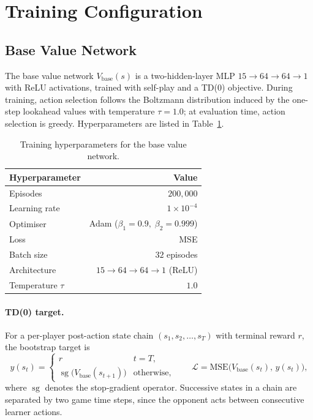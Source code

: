 \section{Training Configuration}
\label{app:hyper}

\subsection{Base Value Network}

The base value network $V_{\text{base}}(s)$ is a two-hidden-layer MLP
$15 \to 64 \to 64 \to 1$ with ReLU activations, trained with self-play
and a TD(0) objective. During training, action selection follows the
Boltzmann distribution induced by the one-step lookahead values with
temperature $\tau = 1.0$; at evaluation time, action selection is
greedy. Hyperparameters are listed in Table~\ref{tab:base-hyper}.

\begin{table}[h]
\centering
\caption{Training hyperparameters for the base value network.}
\label{tab:base-hyper}
\begin{tabular}{lr}
\toprule
\textbf{Hyperparameter} & \textbf{Value} \\
\midrule
Episodes              & $200{,}000$         \\
Learning rate         & $1\times 10^{-4}$   \\
Optimiser             & Adam ($\beta_1{=}0.9,\;\beta_2{=}0.999$) \\
Loss                  & MSE                 \\
Batch size            & $32$ episodes       \\
Architecture          & $15 \to 64 \to 64 \to 1$ (ReLU) \\
Temperature $\tau$    & $1.0$               \\
\bottomrule
\end{tabular}
\end{table}

\paragraph{TD(0) target.}
For a per-player post-action state chain $(s_1, s_2, \dots, s_T)$ with
terminal reward $r$, the bootstrap target is
\begin{equation*}
y(s_t) =
\begin{cases}
r & t = T, \\
\operatorname{sg}\!\bigl(V_{\text{base}}(s_{t+1})\bigr) & \text{otherwise},
\end{cases}
\qquad
\mathcal{L} = \mathrm{MSE}\!\bigl(V_{\text{base}}(s_t),\,y(s_t)\bigr),
\end{equation*}
where $\operatorname{sg}$ denotes the stop-gradient operator. Successive
states in a chain are separated by two game time steps, since the opponent
acts between consecutive learner actions.

